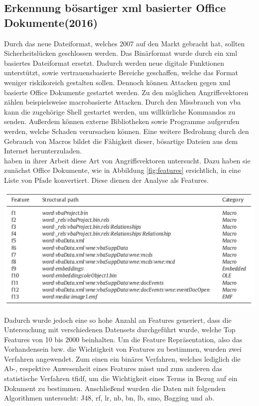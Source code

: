 \documentclass[
    12pt, %
    DIV10,
    ngerman, %
    a4paper, %
    oneside, %
    titlepage, %
    parskip=half, %
    headings=normal, %
    listof=totoc, %
    bibliography=totoc, %
    index=totoc, %
    captions=tableheading, %
    final %
]{scrreprt}
\begin{document}
\subsection{Erkennung bösartiger \acs{xml} basierter Office Dokumente(2016)}
Durch das neue Dateiformat, welches 2007 auf den Markt gebracht hat, sollten Sicherheitslücken geschlossen werden.
Das Binärformat wurde durch ein	\ac{xml} basiertes Dateiformat ersetzt. Dadurch werden neue digitale Funktionen unterstützt, sowie vertrauensbasierte Bereiche geschaffen, welche das Format weniger riskikoreich gestalten sollen. Dennoch können Attacken gegen \ac{xml} basierte Office Dokumente gestartet werden. Zu den möglichen Angriffsvektoren zählen beispielsweise macrobasierte Attacken. Durch den Missbrauch von \ac{vba} kann die zugehörige Shell gestartet werden, um willkürliche Kommandos zu senden. Au{\ss}erdem können externe Bibliotheken sowie Programme aufgerufen werden, welche Schaden verursachen können. Eine weitere Bedrohung durch den Gebrauch von Macros bildet die Fähigkeit dieser, bösartige Dateien aus dem Internet herunterzuladen.\\
\textcite{Cohen2016} haben in ihrer Arbeit diese Art von Angriffsvektoren untersucht. Dazu haben sie zunächst Office Dokumente, wie in Abbildung \ref{fig:features} ersichtlich, in eine Liste von Pfade konvertiert. Diese dienen der Analyse als Features.
\begin{center}
\includegraphics[scale=0.6]{img/pfade.png}
\label{fig:features}
\end{center}
Dadurch wurde jedoch eine so hohe Anzahl an Features generiert, dass die Untersuchung mit verschiedenen Datensets durchgeführt wurde, welche Top Features von 10 bis 2000 beinhalten. Um die Feature Repräsentation, also das Vorhandensein bzw. die Wichtigkeit von Features zu bestimmen, wurden zwei Verfahren angewendet. Zum einen ein binäres Verfahren, welches lediglich die Ab-, respektive Anwesenheit eines Features misst und zum anderen das statistische Verfahren \ac{tfidf}, um die Wichtigkeit eines Terms in Bezug auf ein Dokument zu bestimmen. Anschlie{\ss}end wurden die Daten mit folgenden Algorithmen untersucht: J48, \ac{rf}, \ac{lr}, \ac{nb}, \ac{bn}, \ac{lb}, \ac{smo}, Bagging und \ac{ab}. \\\\
\end{document}
